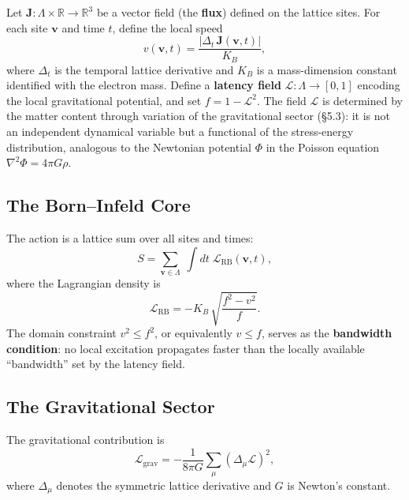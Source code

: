 \documentclass[12pt,a4paper]{article}
\begin{document}
Let $\mathbf{J}: \Lambda \times \mathbb{R} \to \mathbb{R}^{3}$ be a vector field (the \textbf{flux}) defined on the lattice sites. For each site $\mathbf{v}$ and time $t$, define the local speed
\begin{equation}\label{eq:speed}
v(\mathbf{v}, t) = \frac{|\Delta_{t}\,\mathbf{J}(\mathbf{v}, t)|}{K_{B}},
\end{equation}
where $\Delta_{t}$ is the temporal lattice derivative and $K_{B}$ is a mass-dimension constant identified with the electron mass. Define a \textbf{latency field} $\mathcal{L}: \Lambda \to [0, 1]$ encoding the local gravitational potential, and set $f = 1 - \mathcal{L}^{2}$. The field $\mathcal{L}$ is determined by the matter content through variation of the gravitational sector (\S5.3): it is not an independent dynamical variable but a functional of the stress-energy distribution, analogous to the Newtonian potential $\Phi$ in the Poisson equation $\nabla^{2}\Phi = 4\pi G\rho$.

\subsection{The Born--Infeld Core}

The action is a lattice sum over all sites and times:
\begin{equation}\label{eq:action}
S = \sum_{\mathbf{v} \in \Lambda}\;\int dt\;\mathcal{L}_{\mathrm{RB}}(\mathbf{v}, t),
\end{equation}
where the Lagrangian density is
\begin{equation}\label{eq:lagrangian}
\mathcal{L}_{\mathrm{RB}} = -K_{B}\,\sqrt{\frac{f^{2} - v^{2}}{f}}.
\end{equation}
The domain constraint $v^{2} \leq f^{2}$, or equivalently $v \leq f$, serves as the \textbf{bandwidth condition}: no local excitation propagates faster than the locally available ``bandwidth'' set by the latency field.

\subsection{The Gravitational Sector}

The gravitational contribution is
\begin{equation}\label{eq:grav}
\mathcal{L}_{\mathrm{grav}} = -\frac{1}{8\pi G}\sum_{\mu}\left(\Delta_{\mu}\mathcal{L}\right)^{2},
\end{equation}
where $\Delta_{\mu}$ denotes the symmetric lattice derivative and $G$ is Newton's constant.
\end{document}
